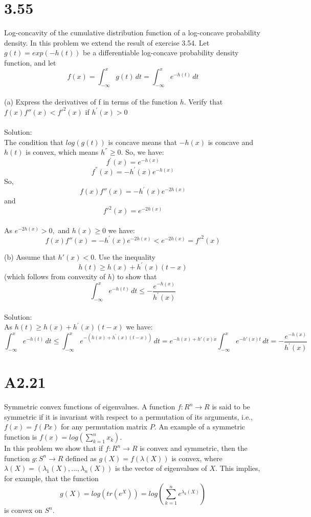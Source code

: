 \documentclass{article}
\begin{document}
\section*{3.55} %
Log-concavity of the cumulative distribution function of a log-concave probability density.
In this problem we extend the result of exercise 3.54. 
Let $g(t) = exp(-h(t))$ be a differentiable
log-concave probability density function, and let 
$$ f(x) = \int_{- \infty}^{x} g(t) \,dt  = 
\int_{- \infty}^{x} e^{-h(t)} \,dt$$ \\

(a) Express the derivatives of f in terms of the function $h$. Verify that 
$f(x)f{''}(x) < f{'}^2(x)$ if $h^{'}(x) > 0$ \\ \\
Solution: \\

The  condition that $log(g(t))$ is concave means that $- h(x)$ is concave and $h(t)$ is convex, which means 
$h^{''} \geq 0$. So, we have:
$$f^{'}(x) = e^{-h(x)}$$
$$f^{''}(x) = - h^{'}(x) e^{-h(x)}$$
So, $$f(x)f{''}(x) = 
- h^{'}(x) e^{-2h(x)}$$ and 
$$f{'}^2(x) = e^{-2h(x)}$$ \\ 
As $e^{-2h(x)} > 0,$ and $h(x) \geq 0$ we have: \\
$$f(x)f{''}(x) = 
-h^{'}(x) e^{-2h(x)} < 
 e^{-2h(x)}  = f{'}^2(x)$$
 
(b) Assume that $h{'}(x) < 0.$ Use the inequality 
$$ h(t) \ge h(x) + h^{'}(x) (t - x)$$ (which follows from convexity of $h$) to show that
$$\int_{- \infty}^{x} e^{-h(t)} \,dt \leq -\frac{e^{-h(x)}}{h^{'}(x)}$$ \\
Solution:\\

As $ h(t) \ge h(x) + h^{'}(x) (t - x)$ we have:
$$\int_{- \infty}^{x} e^{-h(t)} \,dt \leq \int_{- \infty}^{x} e^{- (h(x) + h^{'}(x) (t - x))}\,dt = 
e^{-h(x) + h{'}(x) x} \int_{- \infty}^{x} e^{{-h{'}(x)}t} \,dt = -\frac{e^{-h(x)}}{h^{'}(x)} $$

\section*{A2.21} %
 Symmetric convex functions of eigenvalues. A function 
 $f: R^n \rightarrow R$ is said to be symmetric if it is
 invariant with respect to a permutation of its arguments, i.e., 
 $f(x) = f(Px)$ for any permutation matrix $P.$ An example of a symmetric function is 
 $f(x) = log(\sum_{k = 1}^{n}x_k).$\\
 In this problem we show that if $f: R^n \rightarrow R$ 
 is convex and symmetric, then the function
 $g: S^n \rightarrow R$ defined as 
 $g(X) = f(\lambda(X))$ is convex, where 
 $\lambda(X) = (\lambda_1(X), ... ,\lambda_n(X))$ is the vector of  eigenvalues of $X.$ This implies, for example, that the function 
 $$g(X) = log(tr(e^X)) = 
 log(\sum_{k = 1}^{n} e ^ {\lambda_k(X)})$$
 is convex on $S^n$. \\
 
\end{document}
